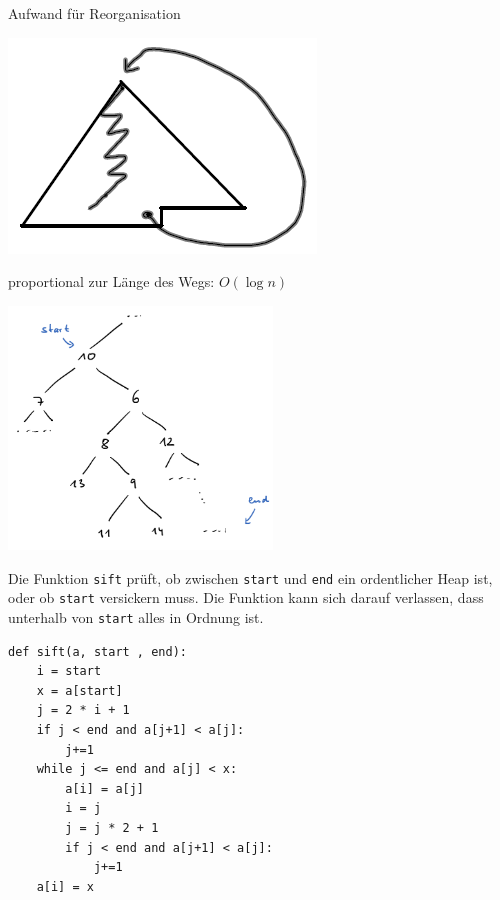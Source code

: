 \documentclass{beamer}
\begin{document}
\begin{frame}[fragile]
Aufwand für Reorganisation 

\includegraphics[scale=0.6]{heap2.png}

proportional zur Länge des Wegs: \pause $O(\log n)$
\end{frame}

\begin{frame}[fragile]

\begin{minipage}[c]{7cm}
\includegraphics[width=7cm]{heap4.png}
\end{minipage}
\begin{minipage}[c]{4cm}
Die Funktion \texttt{sift} prüft, ob zwischen \texttt{start} und \texttt{end} ein ordentlicher Heap ist, oder ob \texttt{start} versickern muss.
Die Funktion kann sich darauf verlassen, dass unterhalb von \texttt{start} alles in Ordnung ist.
\end{minipage}
\end{frame}

\begin{frame}[fragile]

\begin{lstlisting} 
def sift(a, start , end):
    i = start
    x = a[start]
    j = 2 * i + 1
    if j < end and a[j+1] < a[j]:
        j+=1
    while j <= end and a[j] < x:
        a[i] = a[j]
        i = j
        j = j * 2 + 1
        if j < end and a[j+1] < a[j]:
            j+=1
    a[i] = x
\end{lstlisting} 
\end{frame}
\end{document}
